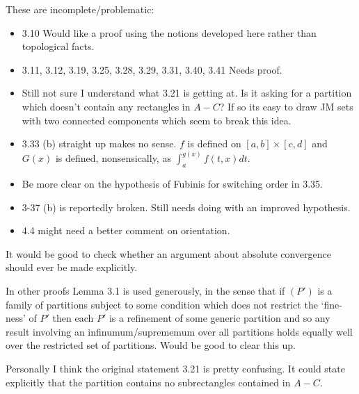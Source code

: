 \documentclass[20pt]{article}
\theoremstyle{plain}
\theoremstyle{definition}
\begin{document}
These are incomplete/problematic:
\begin{itemize}
  \item 3.10 Would like a proof using the notions developed here rather than 
  topological facts.
  \item 3.11, 3.12, 3.19, 3.25, 3.28, 3.29, 3.31, 3.40, 3.41 Needs proof.
  \item Still not sure I understand what 3.21 is getting at.  Is it asking for a partition 
  which doesn't contain any rectangles in $A-C$? If so its easy to 
  draw JM sets with two connected components which seem to break this idea.
  \item 3.33 (b) straight up makes no sense. $f$ is defined on $[a, b] \times [c, d]$
  and $G(x)$ is defined, nonsensically, as $\int_a^{g(x)}f(t, x)dt$.
  \item Be more clear on the hypothesis of Fubinis for switching order in 3.35.
  \item 3-37 (b) is reportedly broken. Still needs doing with an improved 
  hypothesis.
  \item 4.4 might need a better comment on orientation.
\end{itemize}

It would be good to check whether an argument about absolute convergence should ever be made explicitly.  

In other proofs Lemma 3.1 is used generously, in the sense that if $(P')$ 
is a family of partitions subject to some condition which does not restrict the
`fine-ness' of $P'$
then each $P'$ is a refinement of some generic partition and so any result 
involving an infinumum/suprememum over all partitions holds equally well over
the restricted set of partitions.  Would be good to clear this up.

Personally I think the original statement 3.21 is pretty confusing.  It could 
state explicitly that the partition contains no subrectangles contained in $A-C.$
\vspace{3em}
\end{document}
